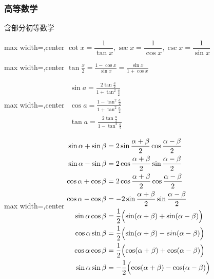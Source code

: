 \documentclass[twocolumn,10pt]{ctexart}
\begin{document}
\subsubsection{高等数学}

\begin{notebox}
含部分初等数学
\end{notebox}

\begin{adjustbox}{max width=\linewidth,center}
$\cot x=\dfrac 1{\tan x},\sec x=\dfrac 1{\cos x},\csc x=\dfrac{1}{\sin x}$
\end{adjustbox}

\begin{adjustbox}{max width=\linewidth,center}
$\tan\frac{x}{2}=\frac{1-\cos x}{\sin x}
=\frac{\sin x}{1+\cos x}$
\end{adjustbox}

\begin{adjustbox}{max width=\linewidth,center}
$\begin{gathered}
\sin a=\frac{2\tan\frac{a}{2}}{1+\tan^2\frac{a}{2}}\\
\cos a=\frac{1-\tan^2\frac{a}{2}}{1+\tan^2\frac{a}{2}}\\
\tan a=\frac{2\tan\frac{a}{2}}{1-\tan^2\frac{a}{2}}
\end{gathered}$
\end{adjustbox}

\begin{adjustbox}{max width=\linewidth,center}
$\begin{aligned}
\sin\alpha+\sin\beta&=2\sin\frac{\alpha+\beta}{2}\cos\frac{\alpha-\beta}{2}\\
\sin\alpha-\sin\beta&=2\cos\frac{\alpha+\beta}{2}\sin\frac{\alpha-\beta}{2}\\
\cos\alpha+\cos\beta&=2\cos\frac{\alpha+\beta}{2}\cos\frac{\alpha-\beta}{2}\\
\cos\alpha-\cos\beta&=-2\sin\frac{\alpha+\beta}{2}\sin\frac{\alpha-\beta}{2}\\
\sin\alpha\cos\beta&=\frac{1}{2}\Bigl(\sin(\alpha+\beta)+\sin(\alpha-\beta)\Bigr)\\
\cos\alpha\sin\beta&=\frac{1}{2}\Bigl(\sin(\alpha+\beta)-sin(\alpha-\beta)\Bigr)\\
\cos\alpha\cos\beta&=\frac{1}{2}\Bigl(\cos(\alpha+\beta)+\cos(\alpha-\beta)\Bigr)\\
\sin\alpha\sin\beta&=-\frac{1}{2}\Bigl(\cos(\alpha+\beta)-\cos(\alpha-\beta)\Bigr)\\
\end{aligned}$
\end{adjustbox}
\end{document}
